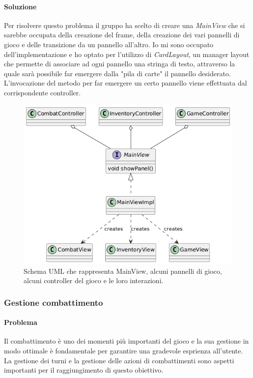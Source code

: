 \documentclass[a4paper,12pt]{report}
\begin{document}
\paragraph{Soluzione} Per risolvere questo problema il gruppo ha scelto di creare una \textit{MainView} che
si sarebbe occupata della creazione del frame, della creazione dei vari pannelli di gioco e
delle transizione da un pannello all'altro.
Io mi sono occupato dell'implementazione e ho optato per l'utilizzo di \textit{CardLayout}, un manager layout
che permette di associare ad ogni pannello una stringa di testo, attraverso la quale sarà possibile far emergere
dalla "pila di carte" il pannello desiderato. L'invocazione del metodo per far emergere un certo pannello viene effettuata
dal corrispondente controller.
\begin{figure}[H]
	\centering{}
	\includegraphics[width=\textwidth]{img/mainView.png}
	\caption{Schema UML che rappresenta MainView, alcuni pannelli di gioco, alcuni controller del gioco e le loro interazioni.}
	\label{img:mainView}
\end{figure}

\subsubsection{Gestione combattimento}

\paragraph{Problema} Il combattimento è uno dei momenti più importanti del gioco e la sua gestione 
in modo ottimale è fondamentale per garantire una gradevole esprienza all'utente. La gestione dei turni e la 
gestione delle azioni di combattimenti sono aspetti importanti per il raggiungimento di questo obiettivo.
\end{document}

